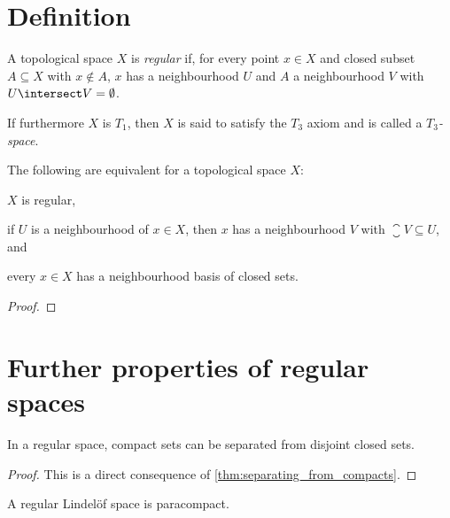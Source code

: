 \documentclass[article, a4paper, 11pt, oneside]{memoir}
\numberwithin{equation}{chapter}
\begin{document}
\section{Definition}

\begin{definition}
    A topological space $X$ is \emph{regular} if, for every point $x \in X$ and closed subset $A \subseteq X$ with $x \not\in A$, $x$ has a neighbourhood $U$ and $A$ a neighbourhood $V$ with $U \intersect V = \emptyset$.

    If furthermore $X$ is $T_1$, then $X$ is said to satisfy the $T_3$ axiom and is called a \emph{$T_3$-space}.
\end{definition}


\begin{proposition}
    The following are equivalent for a topological space $X$:
    \begin{enumprop}
        \item $X$ is regular,

        \item if $U$ is a neighbourhood of $x \in X$, then $x$ has a neighbourhood $V$ with $\closure{V} \subseteq U$, and

        \item every $x \in X$ has a neighbourhood basis of closed sets.
    \end{enumprop}
\end{proposition}

\begin{proof}
    
\end{proof}


\section{Further properties of regular spaces}

\begin{proposition}
    In a regular space, compact sets can be separated from disjoint closed sets.
\end{proposition}

\begin{proof}
    This is a direct consequence of \cref{thm:separating_from_compacts}.
\end{proof}


\begin{proposition}
    \label{thm:regular-Lindelof-is-paracompact}
    A regular Lindelöf space is paracompact.
\end{proposition}
\end{document}
